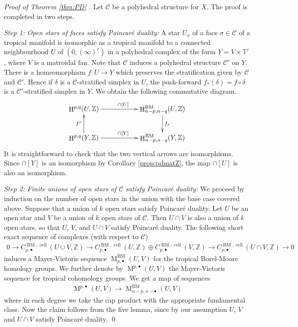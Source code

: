 \documentclass[11pt]{article}
\numberwithin{equation}{numsection}
\newcommand{\Z}{{\mathbb Z}}
\newcommand{\CC}{{\mathcal C}}
\newcommand{\T}{{\mathbb T}}
\DeclareMathOperator{\BM}{BM}
\DeclareMathOperator{\HH}{H}
\DeclareMathOperator{\cell}{cell}
\DeclareMathOperator{\MM}{M}
\begin{document}
\begin{proof}[Proof of Theorem \ref{thm:PD}  ]
Let $\CC$ be a polyhedral structure for $X$. 
The proof is completed in two steps. 

\emph{Step 1:
Open stars of faces satisfy Poincar\'e duality:}
A star $U_\sigma$ of a face $\sigma \in \CC$ of a tropical manifold is isomorphic as a tropical manifold 
to a connected neighbourhood $U$ of $(0, (\infty)^r)$ in a polyhedral complex of the 
form $Y = V \times \T^r$, where $V$ is a matroidal fan. 
Note that $\CC$ induces a polyhedral structure $\CC'$ on $Y$.
There is a homeomorphism $f \colon U \to  Y$ 
which preserves the stratification given by $\CC$ and $\CC'$. 
Hence if $\delta$ is a $\CC$-stratified simplex in $U$, the push-forward 
$f_*(\delta) = f \circ \delta$ is a $\CC'$-stratified simplex in $Y$. 
We obtain the following commutative diagram.
\begin{align*}
\begin{xy}
\xymatrix{
\HH^{p,q}(U, \Z)  \ar[rr]^{\cap [U]}  				&& \HH^{\BM}_{n-p,n-q}(U, \Z) \ar[d]^{f_*} \\
\HH^{p,q}(Y, \Z) \ar[rr]^{\cap [Y]}    \ar[u]^{f^*}           && \HH^{\BM}_{n-p,n-q}(Y, \Z)  
}
\end{xy}
\end{align*}
It is straightforward to check that the two vertical arrows are isomorphisms.
Since $\cap [Y]$ is an isomorphism by Corollary \ref{prop:pdmatZ}, 
the map  $\cap [U]$ is also an isomorphism. 


\emph{Step 2:
Finite unions of open stars of $\CC$ satisfy Poincar\'e duality:} 
We proceed by induction on the number of open stars in the union with the base case covered above.  
 Suppose that a union of $k$ open stars satisfy Poincar\'e duality. 
Let $U$ be an open star and $V$ be a union of $k$  open stars of $\CC$. 
Then $U \cap V$ is also a union of $k$ open stars,  so that $U$, $V$, and $U \cap V$ satisfy Poincar\'e duality.
The following short exact sequence of complexes (with respect to $\CC$)
\begin{align*}
0 \to C_{p,\bullet}^{\BM, \cell}(U \cup V, \Z) \to C_{p,\bullet}^{\BM, \cell}(U, \Z) \oplus C_{p,\bullet}^{\BM, \cell}(V, \Z) 
\to C_{p,\bullet}^{\BM, \cell}(U \cap V, \Z) \to 0
\end{align*}
induces a Mayer-Vietoris sequence {$\MM_{p,\bullet}^{\BM}(U,V)$} for 
the tropical Borel-Moore homology groups. 
We further denote by $\MM^{p,\bullet}(U, V)$ the Mayer-Vietoris sequence for 
tropical cohomology groups. 
We get a map of sequences
\begin{align*}
\MM^{p,\bullet}(U,V) \to {\MM_{n-p,n-\bullet}^{\BM}(U,V)}
\end{align*}
where in each degree we take the cap product with the appropriate fundamental class. 
Now the claim follows from the five lemma,
since by our assumption $U$, $V$ and $U\cap V$ satisfy Poincar\'e duality. 
\qed
\end{proof}
\end{document}
